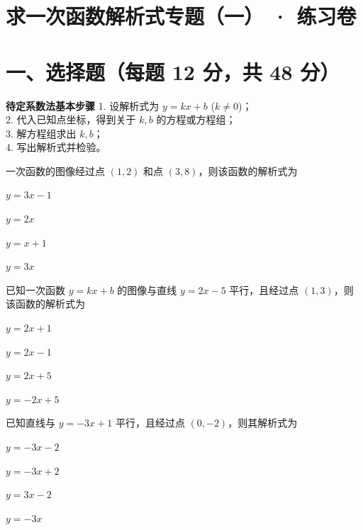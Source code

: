 \documentclass{exam-zh}
\begin{document}
\section*{求一次函数解析式专题（一） · 练习卷}

\section*{一、选择题（每题 12 分，共 48 分）}


\begin{keyideabox}
  \textbf{待定系数法基本步骤}
  1. 设解析式为 $y=kx+b$ ($k\neq0$)；\\ 2. 代入已知点坐标，得到关于 $k, b$ 的方程或方程组；\\ 3. 解方程组求出 $k, b$；\\ 4. 写出解析式并检验。
\end{keyideabox}



\begin{question}[points=12]
  一次函数的图像经过点 $(1, 2)$ 和点 $(3, 8)$，则该函数的解析式为
  \begin{choices}
    \item $y = 3x - 1$
    \item $y = 2x$
    \item $y = x + 1$
    \item $y = 3x$
  \end{choices}
\end{question}



\begin{question}[points=12]
  已知一次函数 $y = kx + b$ 的图像与直线 $y = 2x - 5$ 平行，且经过点 $(1, 3)$，则该函数的解析式为
  \begin{choices}
    \item $y = 2x + 1$
    \item $y = 2x - 1$
    \item $y = 2x + 5$
    \item $y = -2x + 5$
  \end{choices}
\end{question}



\begin{question}[points=12]
  已知直线与 $y = -3x + 1$ 平行，且经过点 $(0, -2)$，则其解析式为
  \begin{choices}
    \item $y = -3x - 2$
    \item $y = -3x + 2$
    \item $y = 3x - 2$
    \item $y = -3x$
  \end{choices}
\end{question}
\end{document}
